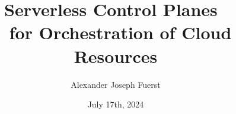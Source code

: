 \documentclass{thesis}
\begin{document}
\title{Serverless Control Planes~\\~for Orchestration of Cloud Resources}
\author{Alexander Joseph Fuerst}
\date{July 17th, 2024}



\beforepreface

\afterpreface











% 








\cvsection
\end{document}
